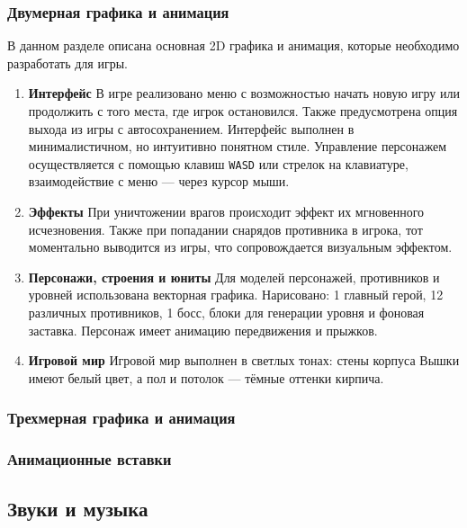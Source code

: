 \documentclass{article}
\begin{document}
\subsubsection{Двумерная графика и анимация}
    В данном разделе описана основная 2D графика и анимация, которые необходимо разработать для игры.
    \begin{enumerate}
    \item \textbf{Интерфейс}
    В игре реализовано меню с возможностью начать новую игру или продолжить с того места, где игрок остановился. Также предусмотрена опция выхода из игры с автосохранением. Интерфейс выполнен в минималистичном, но интуитивно понятном стиле. Управление персонажем осуществляется с помощью клавиш \texttt{WASD} или стрелок на клавиатуре, взаимодействие с меню — через курсор мыши.

    \item \textbf{Эффекты}
    При уничтожении врагов происходит эффект их мгновенного исчезновения. Также при попадании снарядов противника в игрока, тот моментально выводится из игры, что сопровождается визуальным эффектом.

    \item \textbf{Персонажи, строения и юниты}
    Для моделей персонажей, противников и уровней использована векторная графика. Нарисовано: 1 главный герой, 12 различных противников, 1 босс, блоки для генерации уровня и фоновая заставка. Персонаж имеет анимацию передвижения и прыжков.

    \item \textbf{Игровой мир}
    Игровой мир выполнен в светлых тонах: стены корпуса Вышки имеют белый цвет, а пол и потолок — тёмные оттенки кирпича.
    \end{enumerate}
\subsubsection{Трехмерная графика и анимация}

\subsubsection{Анимационные вставки}

\subsection{Звуки и музыка}
\end{document}
